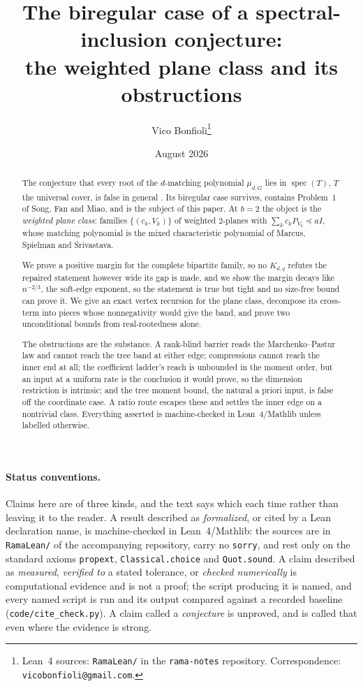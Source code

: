 \documentclass[11pt]{article}
\title{The biregular case of a spectral-inclusion conjecture:\\
the weighted plane class and its obstructions}
\author{Vico Bonfioli\thanks{Lean~4 sources: \texttt{RamaLean/} in the \texttt{rama-notes} repository. Correspondence: \texttt{vicobonfioli@gmail.com}.}}
\date{August 2026}
\theoremstyle{remark}
\begin{document}
\maketitle

\begin{abstract}
The conjecture that every root of the $d$-matching polynomial $\mu_{d,G}$ lies in
$\operatorname{spec}(T)$, $T$ the universal cover, is false in general \cite{PartI}. Its
biregular case survives, contains Problem~1 of Song, Fan and Miao, and is the subject of this
paper. At $b=2$ the object is the \emph{weighted plane class}: families $\{(c_k,V_k)\}$ of
weighted $2$-planes with $\sum_kc_kP_{V_k}\preceq aI$, whose matching polynomial is the mixed
characteristic polynomial of Marcus, Spielman and Srivastava.

We prove a positive margin for the complete bipartite family, so no $K_{d,q}$ refutes the
repaired statement however wide its gap is made, and we show the margin decays like $n^{-2/3}$,
the soft-edge exponent, so the statement is true but tight and no size-free bound can prove it.
We give an exact vertex recursion for the plane class, decompose its cross-term into pieces whose
nonnegativity would give the band, and prove two unconditional bounds from real-rootedness alone.

The obstructions are the substance. A rank-blind barrier reads the Marchenko--Pastur law and
cannot reach the tree band at either edge; compressions cannot reach the inner end at all; the
coefficient ladder's reach is unbounded in the moment order, but an input at a uniform rate is
the conclusion it would prove, so the dimension restriction is intrinsic; and the tree moment
bound, the natural a priori input, is false off the coordinate case. A ratio route escapes these
and settles the inner edge on a nontrivial class. Everything asserted is machine-checked in
Lean~4/Mathlib unless labelled otherwise.
\end{abstract}

\paragraph{Status conventions.} Claims here are of three kinds, and the text says which each time
rather than leaving it to the reader. A result described as \emph{formalized}, or cited by a Lean
declaration name, is machine-checked in Lean~4/Mathlib: the sources are in \texttt{RamaLean/} of
the accompanying repository, carry no \texttt{sorry}, and rest only on the standard axioms
\texttt{propext}, \texttt{Classical.choice} and \texttt{Quot.sound}. A claim described as
\emph{measured}, \emph{verified to} a stated tolerance, or \emph{checked numerically} is
computational evidence and is not a proof; the script producing it is named, and every named
script is run and its output compared against a recorded baseline
(\texttt{code/cite\_check.py}). A claim called a \emph{conjecture} is unproved, and is called
that even where the evidence is strong.
\end{document}

